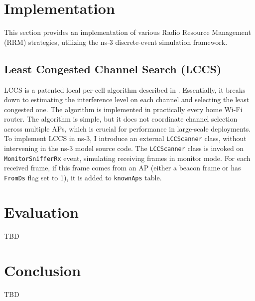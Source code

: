 \section{Implementation}
\label{chap:impl:sec:implementation}
This section provides an implementation of various Radio Resource Management (RRM) strategies, utilizing the ns-3 discrete-event simulation framework.

\subsection{Least Congested Channel Search (LCCS)}
\label{chap:impl:sec:implementation:lccs}
LCCS is a patented local per-cell algorithm described in \cite{achantaMethodApparatusLeast2006}. Essentially, it breaks down to estimating the interference level on each channel and selecting the least congested one. The algorithm is implemented in practically every home Wi-Fi router. The algorithm is simple, but it does not coordinate channel selection across multiple APs, which is crucial for performance in large-scale deployments.
To implement LCCS in ns-3, I introduce an external \texttt{LCCScanner} class, without intervening in the ns-3 model source code. The \texttt{LCCScanner} class is invoked on \texttt{MonitorSnifferRx} event, simulating receiving frames in monitor mode. For each received frame, if this frame comes from an AP (either a beacon frame or has \texttt{FromDs} flag set to 1), it is added to \texttt{knownAps} table.


\section{Evaluation}
\label{chap:impl:sec:eval}
TBD

\section{Conclusion}
\label{chap:impl:sec:conclusion}
TBD